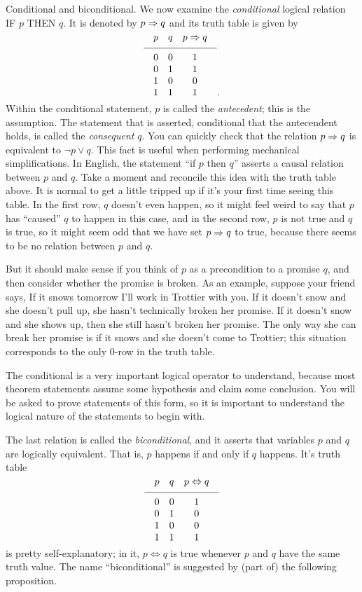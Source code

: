 \medskip\boldlabel{} Conditional and biconditional. We now examine the {\it conditional}
logical relation {\mc IF} $p$ {\mc THEN} $q$. It is denoted by $p\Rightarrow q$ and its truth table is given by
$$
\vbox{
\tabskip=1em plus.2em minus .2em
\halign{
\hfil$#$\hfil & \hfil$#$\hfil & \hfil$#$\hfil \cr
p & q & p\To q \cr
\noalign{\medskip}
\noalign{\hrule}
\noalign{\medskip}
0 & 0 & 1 \cr
0 & 1 & 1 \cr
1 & 0 & 0 \cr
1 & 1 & 1 \cr
}}.
$$
Within the conditional statement, $p$ is called the {\it antecedent}; this is the assumption. The
statement that is asserted, conditional that the antecendent holds, is called the {\it consequent} $q$.
You can quickly check that the relation $p\Rightarrow q$ is equivalent to $\neg p \vee q$. This fact is useful
when performing mechanical simplifications.
In English, the statement ``if $p$ then $q$'' asserts a causal relation between $p$ and $q$.
Take a moment and reconcile this idea with the truth table above.
It is normal to get a little tripped up if it's your first time seeing this table.
In the first row, $q$ doesn't even happen, so it might feel weird to say that $p$
has ``caused'' $q$ to happen in this case, and
in the second row, $p$ is not true
and $q$ is true, so it might seem odd that we have set $p\Rightarrow q$ to true, because there seems to be no relation
between $p$ and $q$.

But it should make sense if you think
of $p$ as a precondition to a promise $q$, and then consider
whether the promise is broken. As an example,
suppose your friend says, If it snows tomorrow I'll work in Trottier with you. If it doesn't snow
and she doesn't pull up, she hasn't technically broken her promise. If it doesn't
snow and she shows up, then she still hasn't broken her promise. The only way she can break her promise is if
it snows and she doesn't come to Trottier; this situation corresponds to the only $0$-row in the truth table.

The conditional is a very important logical operator to understand, because most theorem statements assume
some hypothesis and claim some conclusion. You will be asked to prove statements of this form, so it is
important to understand the logical nature of the statements to begin with.

The last relation is called the {\it biconditional}, and it asserts that variables $p$ and $q$ are logically
equivalent. That is, $p$ happens if and only if $q$ happens. It's truth table
$$
\vbox{
\tabskip=1em plus.2em minus .2em
\halign{
\hfil$#$\hfil & \hfil$#$\hfil & \hfil$#$\hfil \cr
p & q & p\Leftrightarrow q \cr
\noalign{\medskip}
\noalign{\hrule}
\noalign{\medskip}
0 & 0 & 1 \cr
0 & 1 & 0 \cr
1 & 0 & 0 \cr
1 & 1 & 1 \cr
}}
$$
is pretty self-explanatory; in it, $p\Leftrightarrow q$ is true whenever $p$ and $q$ have the same truth value.
The name ``biconditional'' is suggested by (part of) the following proposition.

